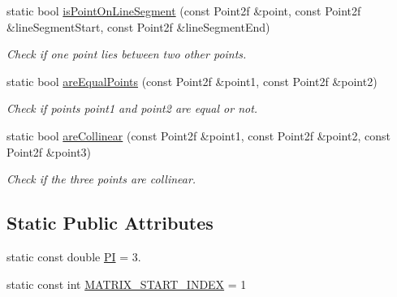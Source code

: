 \begin{DoxyCompactItemize}
static bool \hyperlink{classmultiscale_1_1Geometry2D_a608548e8588d9efbcfec90d2bd92ea55}{is\-Point\-On\-Line\-Segment} (const \-Point2f \&point, const \-Point2f \&line\-Segment\-Start, const \-Point2f \&line\-Segment\-End)
\begin{DoxyCompactList}\small\item\em \-Check if one point lies between two other points. \end{DoxyCompactList}\item 
static bool \hyperlink{classmultiscale_1_1Geometry2D_aa2d3ac595072b9ab61879a44629d7969}{are\-Equal\-Points} (const \-Point2f \&point1, const \-Point2f \&point2)
\begin{DoxyCompactList}\small\item\em \-Check if points point1 and point2 are equal or not. \end{DoxyCompactList}\item 
static bool \hyperlink{classmultiscale_1_1Geometry2D_aa8b75808a35a471becae0ad99e708bdd}{are\-Collinear} (const \-Point2f \&point1, const \-Point2f \&point2, const \-Point2f \&point3)
\begin{DoxyCompactList}\small\item\em \-Check if the three points are collinear. \end{DoxyCompactList}\end{DoxyCompactItemize}
\subsection*{\-Static \-Public \-Attributes}
\begin{DoxyCompactItemize}
\item 
static const double \hyperlink{classmultiscale_1_1Geometry2D_a7039b8bbe89283e22744c0631d597660}{\-P\-I} = 3.
\item 
static const int \hyperlink{classmultiscale_1_1Geometry2D_ade1d55d3ef110b73d42a3e4c4360ba17}{\-M\-A\-T\-R\-I\-X\-\_\-\-S\-T\-A\-R\-T\-\_\-\-I\-N\-D\-E\-X} = 1
\end{DoxyCompactItemize}
